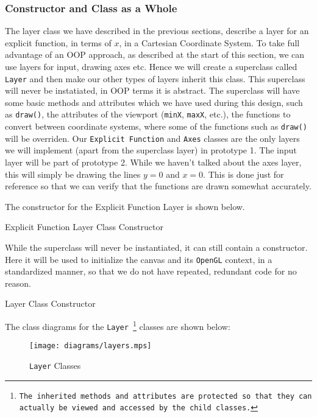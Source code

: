 \documentclass[../../../../../../main.tex]{subfiles}
\begin{document}
\subsubsection{Constructor and Class as a Whole}
The layer class we have described in the previous sections, describe a layer for an explicit function, in terms of $x$, in a Cartesian Coordinate System. To take full advantage of an OOP approach, as described at the start of this section, we can use layers for input, drawing axes etc. Hence we will create a superclass called \texttt{Layer} and then make our other types of layers inherit this class. This superclass will never be instatiated, in OOP terms it is abstract. The superclass will have some basic methods and attributes which we have used during this design, such as \texttt{draw()}, the attributes of the viewport (\texttt{minX}, \texttt{maxX}, etc.), the functions to convert between coordinate systems, where some of the functions such as \texttt{draw()} will be overriden. Our \texttt{Explicit Function} and \texttt{Axes} classes are the only layers we will implement (apart from the superclass layer) in prototype 1. The input layer will be part of prototype 2. While we haven't talked about the axes layer, this will simply be drawing the lines $y=0$ and $x=0$. This is done just for reference so that we can verify that the functions are drawn somewhat accurately.

The constructor for the Explicit Function Layer is shown below.

\begin{algorithm}[H]
\DontPrintSemicolon
\caption{Explicit Function Layer Class Constructor}
\end{algorithm}

While the superclass will never be instantiated, it can still contain a constructor. Here it will be used to initialize the canvas and its \texttt{OpenGL} context, in a standardized manner, so that we do not have repeated, redundant code for no reason.

\begin{algorithm}[H]
\DontPrintSemicolon
\caption{Layer Class Constructor}
\end{algorithm}

The class diagrams for the \texttt{Layer
\footnote{The inherited methods and attributes are protected so that they can actually be viewed and accessed by the child classes.}}
 classes are shown below:
\begin{figure}[H]
	\centering
	\texttt{[image: diagrams/layers.mps]}
	\caption{\texttt{Layer} Classes}
\end{figure}

\newpage
\end{document}
